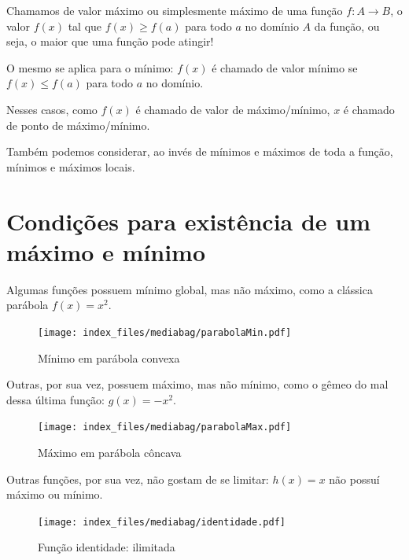 \documentclass[
  portuguese,
  letterpaper,
  DIV=11,
  numbers=noendperiod]{scrreport}
\begin{document}
Chamamos de valor máximo ou simplesmente máximo de uma função
\(f: A \rightarrow B\), o valor \(f(x)\) tal que \(f(x) \geq f(a)\) para
todo \(a\) no domínio \(A\) da função, ou seja, o maior que uma função
pode atingir!

O mesmo se aplica para o mínimo: \(f(x)\) é chamado de valor mínimo se
\(f(x) \leq f(a)\) para todo \(a\) no domínio.

Nesses casos, como \(f(x)\) é chamado de valor de máximo/mínimo, \(x\) é
chamado de ponto de máximo/mínimo.

Também podemos considerar, ao invés de mínimos e máximos de toda a
função, mínimos e máximos locais.

\section{Condições para existência de um máximo e
mínimo}\label{condiuxe7uxf5es-para-existuxeancia-de-um-muxe1ximo-e-muxednimo}

Algumas funções possuem mínimo global, mas não máximo, como a clássica
parábola \(f(x) = x^2\).

\begin{figure}[H]

\caption{Mínimo em parábola convexa}

{\centering \texttt{[image: index\_files/mediabag/parabolaMin.pdf]}

}

\end{figure}%

Outras, por sua vez, possuem máximo, mas não mínimo, como o gêmeo do mal
dessa última função: \(g(x) = -x^2\).

\begin{figure}[H]

\caption{Máximo em parábola côncava}

{\centering \texttt{[image: index\_files/mediabag/parabolaMax.pdf]}

}

\end{figure}%

Outras funções, por sua vez, não gostam de se limitar: \(h(x) = x\) não
possuí máximo ou mínimo.

\begin{figure}[H]

\caption{Função identidade: ilimitada}

{\centering \texttt{[image: index\_files/mediabag/identidade.pdf]}

}

\end{figure}%
\end{document}
